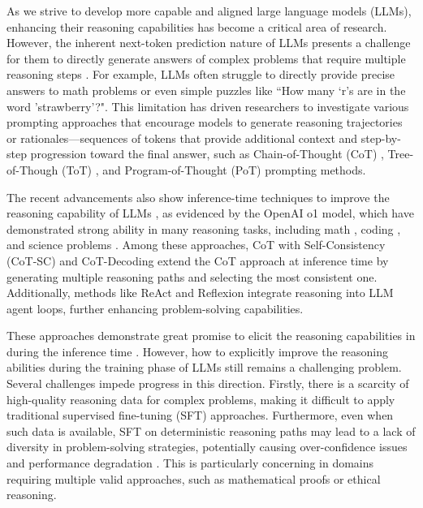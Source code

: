 As we strive to develop more capable and aligned large language models (LLMs), enhancing their reasoning capabilities has become a critical area of research. 
However, the inherent next-token prediction nature of LLMs presents a challenge for them to directly generate answers of complex problems that require multiple reasoning steps \citep{wang2022self,huang2023large}. For example, LLMs often struggle to directly provide precise answers to math problems or even simple puzzles like ``How many `r's are in the word 'strawberry'?".
This limitation has driven researchers to investigate various prompting approaches that encourage models to generate reasoning trajectories or rationales—sequences of tokens that provide additional context and step-by-step progression toward the final answer, such as Chain-of-Thought (CoT) \citep{DBLP:conf/nips/Wei0SBIXCLZ22}, Tree-of-Though (ToT) \citep{yao2024tree}, and Program-of-Thought (PoT) \citep{DBLP:journals/tmlr/ChenM0C23} prompting methods.


The recent advancements also show inference-time techniques to improve the reasoning capability of LLMs \citep{wu2024empirical,brown2024large}, as evidenced by the OpenAI o1 model\citep{openai_learning_2024}, which have demonstrated strong ability in many reasoning tasks, including math \citep{cobbe2021training,trinh2024solving,luo2024improve}, coding \citep{jimenez2023swe,guo2024deepseek,zhang2024diversity}, and science problems \citep{rein2023gpqa}. 
Among these approaches, CoT with Self-Consistency (CoT-SC) \citep{DBLP:conf/iclr/0002WSLCNCZ23} and CoT-Decoding \citep{wang2024chain} extend the CoT approach at inference time by generating multiple reasoning paths and selecting the most consistent one. Additionally, methods like ReAct \citep{DBLP:conf/iclr/YaoZYDSN023} and Reflexion \citep{DBLP:conf/nips/ShinnCGNY23} integrate reasoning into LLM agent loops, further enhancing problem-solving capabilities.

These approaches demonstrate great promise to elicit the reasoning capabilities in during the inference time \citep{snell2024scaling}. However, how to explicitly improve the reasoning abilities during the training phase of LLMs still remains a challenging problem. Several challenges impede progress in this direction. Firstly, there is a scarcity of high-quality reasoning data for complex problems, making it difficult to apply traditional supervised fine-tuning (SFT) approaches. Furthermore, even when such data is available, SFT on deterministic reasoning paths may lead to a lack of diversity in problem-solving strategies, potentially causing over-confidence issues and performance degradation \cite{cobbe2021training}. This is particularly concerning in domains requiring multiple valid approaches, such as mathematical proofs or ethical reasoning.

